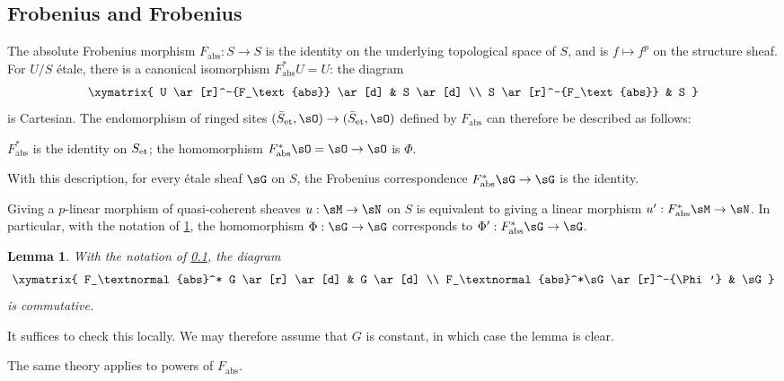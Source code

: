 \documentclass[12pt,oneside,english]{smfbook}
\newcommand{\et}[1]{{#1}_{\textnormal{et}}}
\newtheorem{lemma_}[subsection]{Lemma}
\begin{document}
\subsection{Frobenius and Frobenius}\label{III:3-4}

The absolute Frobenius morphism $F_\text{abs}:S\to S$ is the identity on the underlying topological space of $S$, and is $f\mapsto f^p$ on the structure sheaf. For $U/S$ étale, there is a canonical isomorphism $F_\text{abs}^*U=U$: the diagram
\[\xymatrix{
  U \ar[r]^-{F_\text{abs}} \ar[d]
    & S \ar[d] \\
  S \ar[r]^-{F_\text{abs}}
    & S
}\]
is Cartesian. The endomorphism of ringed sites $(\et{\bar S},\sO)\to(\et{\bar S},\sO)$ defined by $F_\text{abs}$ can therefore be described as follows:
\begin{center}
  $F_\text{abs}^*$ is the identity on $\et S$; the homomorphism $F_\text{abs}^*\sO=\sO\to\sO$ is $\Phi$.
\end{center}
With this description, for every étale sheaf $\sG$ on $S$, the Frobenius correspondence $F_\text{abs}^*\sG\to\sG$ is the identity.

Giving a $p$-linear morphism of quasi-coherent sheaves $u:\sM\to\sN$ on $S$ is equivalent to giving a linear morphism $u':F_\text{abs}^*\sM\to\sN$. In particular, with the notation of \ref{III:3-5}, the homomorphism $\Phi:\sG\to\sG$ corresponds to $\Phi':F_\text{abs}^*\sG\to\sG$.

\begin{lemma_}\label{III:3-5}
With the notation of \ref{III:3-4}, the diagram
\[\xymatrix{
  F_\textnormal{abs}^* G \ar[r] \ar[d]
    & G \ar[d] \\
  F_\textnormal{abs}^*\sG \ar[r]^-{\Phi'}
    & \sG
}\]
is commutative.
\end{lemma_}

It suffices to check this locally. We may therefore assume that $G$ is constant, in which case the lemma is clear.

The same theory applies to powers of $F_\text{abs}$.

\subsection{}\label{III:3-6}
\end{document}
